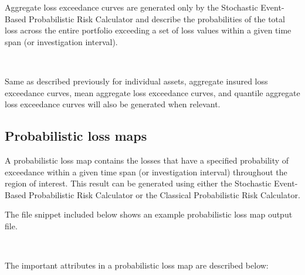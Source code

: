 Aggregate loss exceedance curves are generated only by the Stochastic Event-
Based Probabilistic Risk Calculator and describe the probabilities of the
total loss across the entire portfolio exceeding a set of loss values within a
given time span (or investigation interval).

\inputminted[firstline=1,firstnumber=1,fontsize=\footnotesize,frame=single,bgcolor=lightgray]{xml}{oqum/risk/verbatim/output_loss_curve_aggregate.xml}\\

Same as described previously for individual assets, aggregate insured loss exceedance curves, mean aggregate loss exceedance curves, and quantile aggregate loss exceedance curves will also be generated when relevant.


\subsection{Probabilistic loss maps}
\label{subsec:probabilistic_loss_map}

A probabilistic loss map contains the losses that have a specified probability
of exceedance within a given time span (or investigation interval) throughout
the region of interest. This result can be generated using either the
Stochastic Event-Based Probabilistic Risk Calculator or the Classical
Probabilistic Risk Calculator.

The file snippet included below shows an example probabilistic loss map output
file.

\inputminted[firstline=1,firstnumber=1,fontsize=\footnotesize,frame=single,bgcolor=lightgray]{xml}{oqum/risk/verbatim/output_probabilistic_loss_map.xml}\\

The important attributes in a probabilistic loss map are described below:

